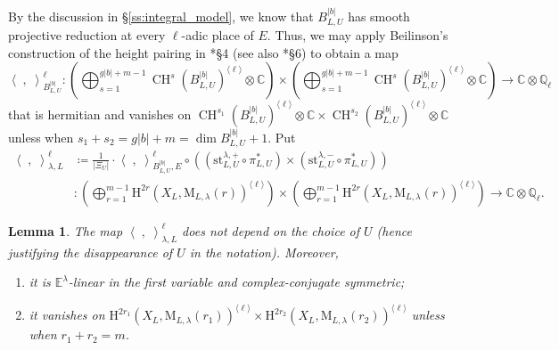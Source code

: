 \documentclass[12pt]{amsart}
\numberwithin{equation}{section}
\theoremstyle{plain}
\newtheorem{lem}[proposition]{Lemma}
\theoremstyle{definition}
\theoremstyle{remark}
\renewcommand{\d}[1]{\mathbb{#1}}
\renewcommand{\r}[1]{\mathrm{#1}}
\renewcommand{\(}{\left(}
\renewcommand{\)}{\right)}
\newcommand{\ang}[1]{\langle{#1}\rangle}
\newcommand{\dC}{\d C}
\newcommand{\dE}{\d E}
\newcommand{\dQ}{\d Q}
\newcommand{\rH}{\r H}
\newcommand{\rM}{\r M}
\newcommand{\llangle}{\left\langle}
\newcommand{\rrangle}{\right\rangle}
\newcommand{\st}{\r{st}}
\DeclareMathOperator{\CH}{CH}
\begin{document}
By the discussion in \S\ref{ss:integral_model}, we know that $B_{L,U}^{|b|}$ has smooth projective reduction at every $\ell$-adic place of $E$. Thus, we may apply Beilinson's construction of the height pairing in \cite{Bei87}*{\S4} (see also \cite{LL21}*{\S6}) to obtain a map
\[
\llangle\;,\;\rrangle_{B_{L,U}^{|b|}}^\ell\colon
\(\bigoplus_{s=1}^{g|b|+m-1}\CH^s(B_{L,U}^{|b|})^{\ang\ell}\otimes\dC\)
\times\(\bigoplus_{s=1}^{g|b|+m-1}\CH^s(B_{L,U}^{|b|})^{\ang\ell}\otimes\dC\)\to\dC\otimes\dQ_\ell
\]
that is hermitian and vanishes on $\CH^{s_1}(B_{L,U}^{|b|})^{\ang\ell}\otimes\dC\times\CH^{s_2}(B_{L,U}^{|b|})^{\ang\ell}\otimes\dC$ unless when $s_1+s_2=g|b|+m=\dim B_{L,U}^{|b|}+1$. Put
\begin{align*}
\llangle\;,\;\rrangle_{\lambda,L}^{\ell}&\coloneqq\frac{1}{|\Xi_U|}\cdot
\llangle\;,\;\rrangle_{B_{L,U}^{|b|},E}^\ell\circ
\((\st_{L,U}^{\lambda,+}\circ\pi_{L,U}^*)\times(\st_{L,U}^{\lambda,-}\circ\pi_{L,U}^*)\) \\
&\colon\(\bigoplus_{r=1}^{m-1}\rH^{2r}(X_L,\rM_{L,\lambda}(r))^{\ang\ell}\)
\times\(\bigoplus_{r=1}^{m-1}\rH^{2r}(X_L,\rM_{L,\lambda}(r))^{\ang\ell}\)\to\dC\otimes\dQ_\ell.
\end{align*}


\begin{lem}
The map $\llangle\;,\;\rrangle_{\lambda,L}^{\ell}$ does not depend on the choice of $U$ (hence justifying the disappearance of $U$ in the notation). Moreover,
\begin{enumerate}
  \item it is $\dE^\lambda$-linear in the first variable and complex-conjugate symmetric;

  \item it vanishes on $\rH^{2r_1}(X_L,\rM_{L,\lambda}(r_1))^{\ang\ell}\times\rH^{2r_2}(X_L,\rM_{L,\lambda}(r_2))^{\ang\ell}$ unless when $r_1+r_2=m$.
\end{enumerate}
\end{lem}
\end{document}
